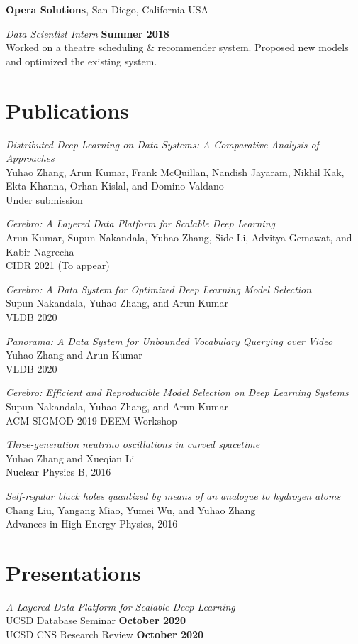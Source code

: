\documentclass[margin,line]{res}
\begin{document}
\begin{resume}
\newpage
{\bf Opera Solutions}, San Diego, California USA

\vspace{-.3cm}
{\em Data Scientist Intern} \hfill {\bf Summer 2018}\\
Worked on a theatre scheduling \& recommender system. Proposed new models and optimized the existing system.

\section{\sc Publications}
\textit{Distributed Deep Learning on Data Systems: A Comparative Analysis of Approaches}\\
Yuhao Zhang, Arun Kumar, Frank McQuillan, Nandish Jayaram, Nikhil Kak, Ekta Khanna, Orhan Kislal, and Domino Valdano\\
Under submission

\textit{Cerebro: A Layered Data Platform for Scalable Deep Learning}\\
Arun Kumar, Supun Nakandala, Yuhao Zhang, Side Li, Advitya Gemawat, and Kabir Nagrecha\\
CIDR 2021 (To appear)

\textit{Cerebro: A Data System for Optimized Deep Learning Model Selection}\\
Supun Nakandala, Yuhao Zhang, and Arun Kumar\\
VLDB 2020

\textit{Panorama: A Data System for Unbounded Vocabulary Querying over Video}\\
Yuhao Zhang and Arun Kumar\\
VLDB 2020

\textit{Cerebro: Efficient and Reproducible Model Selection on Deep Learning Systems}\\
Supun Nakandala, Yuhao Zhang, and Arun Kumar\\
ACM SIGMOD 2019 DEEM Workshop

\textit{Three-generation neutrino oscillations in curved spacetime}\\
Yuhao Zhang and Xueqian Li\\
Nuclear Physics B, 2016

\textit{Self-regular black holes quantized by means of an analogue to hydrogen atoms}\\
Chang Liu, Yangang Miao, Yumei Wu, and Yuhao Zhang\\
Advances in High Energy Physics, 2016

\section{\sc Presentations}
\textit{A Layered Data Platform for Scalable Deep Learning}\\
UCSD Database Seminar \hfill {\bf October 2020}\\
UCSD CNS Research Review \hfill {\bf October 2020}


\end{resume}
\end{document}
